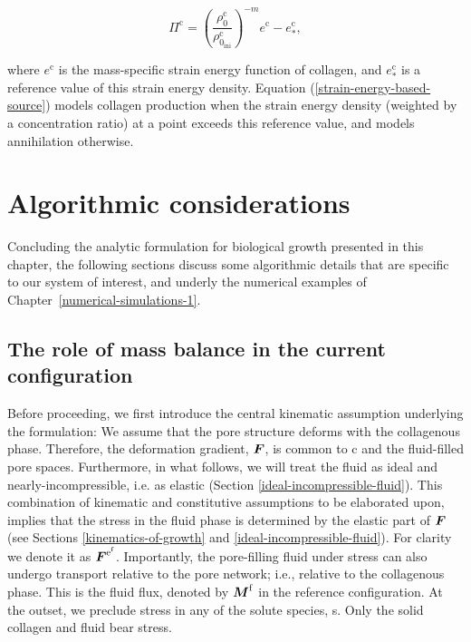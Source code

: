 \begin{equation}
\Pi^\mathrm{c} = \left( \frac{\rho^\mathrm{c}_0}
   {\rho^\mathrm{c}_{0_\mathrm{ini}}} \right)^{-m}
   e^{\mathrm{c}}-e^{\mathrm{c}}_*,
\label{strain-energy-based-source}
\end{equation}

\noindent where $e^{\mathrm{c}}$ is the mass-specific strain energy
function of collagen, and $e^{\mathrm{c}}_*$ is a reference value of
this strain energy density. Equation
(\ref{strain-energy-based-source}) models collagen production when the
strain energy density (weighted by a concentration ratio) at a point
exceeds this reference value, and models annihilation otherwise.

\section{Algorithmic considerations}
\label{algorithmic-considerations}

Concluding the analytic formulation for biological growth presented in
this chapter, the following sections discuss some algorithmic details
that are specific to our system of interest, and underly the numerical
examples of Chapter~\ref{numerical-simulations-1}.

\subsection{The role of mass balance in the current
  configuration}
\label{role-of-current-mass-balance}


Before proceeding, we first introduce the central kinematic assumption
underlying the formulation: We assume that the pore structure deforms
with the collagenous phase. Therefore, the deformation gradient,
$\mbox{\boldmath$ F$}$, is common to c and the fluid-filled pore spaces. Furthermore,
in what follows, we will treat the fluid as ideal and
nearly-incompressible, i.e. as elastic (Section
\ref{ideal-incompressible-fluid}). This combination of kinematic and
constitutive assumptions to be elaborated upon, implies that the
stress in the fluid phase is determined by the elastic part of $\mbox{\boldmath$ F$}$
(see Sections \ref{kinematics-of-growth} and
\ref{ideal-incompressible-fluid}). For clarity we denote it as
$\mbox{\boldmath$ F$}^{\mathrm{e}^\mathrm{f}}$. Importantly, the pore-filling fluid
under stress can also undergo transport relative to the pore network;
i.e., relative to the collagenous phase. This is the fluid flux,
denoted by $\mbox{\boldmath$ M$}^\mathrm{f}$ in the reference configuration. At the
outset, we preclude stress in any of the solute species, s. Only the
solid collagen and fluid bear stress.

